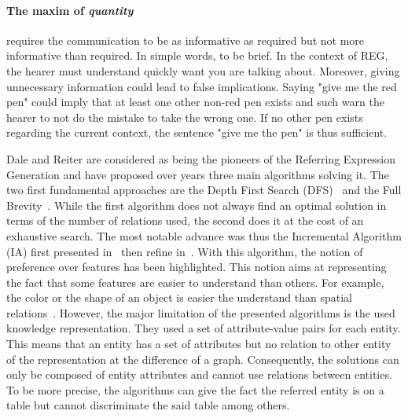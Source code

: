 \paragraph{The maxim of \textit{quantity}} requires the communication to be as informative as required but not more informative than required. In simple words, to be brief. In the context of REG, the hearer must understand quickly want you are talking about. Moreover, giving unnecessary information could lead to false implications. Saying "give me the red pen" could imply that at least one other non-red pen exists and such warn the hearer to not do the mistake to take the wrong one. If no other pen exists regarding the current context, the sentence "give me the pen" is thus sufficient.

Dale and Reiter are considered as being the pioneers of the Referring Expression Generation and have proposed over years three main algorithms solving it. The two first fundamental approaches are the Depth First Search (DFS)~\cite{dale_1989_cooking} and the Full Brevity~\cite{dale_1992_generating}. While the first algorithm does not always find an optimal solution in terms of the number of relations used, the second does it at the cost of an exhaustive search. The most notable advance was thus the Incremental Algorithm (IA) first presented in~\cite{reiter_1992_fast} then refine in~\cite{dale_1995_computational}. With this algorithm, the notion of preference over features has been highlighted. This notion aims at representing the fact that some features are easier to understand than others. For example, the color or the shape of an object is easier the understand than spatial relations~\cite{belke_2002_tracking}. However, the major limitation of the presented algorithms is the used knowledge representation. They used a set of attribute-value pairs for each entity. This means that an entity has a set of attributes but no relation to other entity of the representation at the difference of a graph. Consequently, the solutions can only be composed of entity attributes and cannot use relations between entities. To be more precise, the algorithms can give the fact the referred entity is on a table but cannot discriminate the said table among others.

